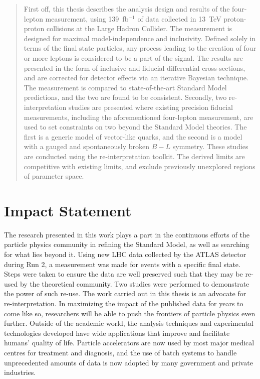 
\begin{abstract}%
  First off, this thesis describes the analysis design and results of the \ATLAS four-lepton measurement, using 139~fb$^{-1}$ of data collected in 13~TeV proton-proton collisions at the Large Hadron Collider. The measurement is designed for maximal model-independence and inclusivity. Defined solely in terms of the final state particles, any process leading to the creation of four or more leptons is considered to be a part of the signal. The results are presented in the form of inclusive and fiducial differential cross-sections, and are corrected for detector effects via an iterative Bayesian technique. The measurement is compared to state-of-the-art Standard Model predictions, and the two are found to be consistent. Secondly, two re-interpretation studies are presented where existing precision fiducial measurements, including the aforementioned four-lepton measurement, are used to set constraints on two beyond the Standard Model theories. The first is a generic model of vector-like quarks, and the second is a model with a gauged and spontaneously broken $B-L$ symmetry. These studies are conducted using the \contur re-interpretation toolkit. The derived limits are competitive with existing \ATLAS limits, and exclude previously unexplored regions of parameter space. 
\end{abstract}

\chapter*{\centering Impact Statement}
The research presented in this work plays a part in the continuous efforts of the particle physics community in refining the Standard Model, as well as searching for what lies beyond it. Using new LHC data collected by the ATLAS detector during Run 2, a measurement was made for events with a specific final state. Steps were taken to ensure the data are well preserved such that they may be re-used by the theoretical community. Two studies were performed to demonstrate the power of such re-use. The work carried out in this thesis is an advocate for re-interpretation. In maximizing the impact of the published data for years to come like so, researchers will be able to push the frontiers of particle physics even further. Outside of the academic world, the analysis techniques and experimental technologies developed have wide applications that improve and facilitate humans' quality of life. Particle accelerators are now used by most major medical centres for treatment and diagnosis, and the use of batch systems to handle unprecedented amounts of data is now adopted by many government and private industries. 


